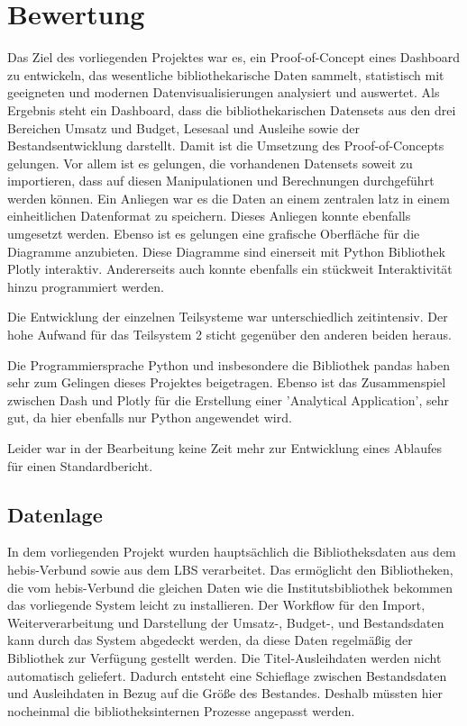 \section{Bewertung}
Das Ziel des vorliegenden Projektes war es, ein Proof-of-Concept eines Dashboard zu entwickeln, 
das wesentliche bibliothekarische Daten sammelt, statistisch mit geeigneten und modernen Datenvisualisierungen analysiert und
auswertet. Als Ergebnis steht ein Dashboard, dass die bibliothekarischen Datensets aus den drei Bereichen Umsatz und Budget,
Lesesaal und Ausleihe sowie der Bestandsentwicklung darstellt. Damit ist die Umsetzung des Proof-of-Concepts gelungen.
Vor allem ist es gelungen, die vorhandenen Datensets soweit zu importieren, dass auf diesen Manipulationen und Berechnungen
durchgeführt werden können. Ein Anliegen war es die Daten an einem zentralen latz in einem einheitlichen Datenformat zu speichern. Dieses
Anliegen konnte ebenfalls umgesetzt werden. Ebenso ist es gelungen eine grafische Oberfläche für die Diagramme anzubieten. 
Diese Diagramme sind einerseit mit Python Bibliothek Plotly interaktiv. Andererseits auch konnte ebenfalls ein stückweit Interaktivität hinzu programmiert werden.

Die Entwicklung der einzelnen Teilsysteme war unterschiedlich zeitintensiv. Der hohe Aufwand für das Teilsystem 2 sticht gegenüber
den anderen beiden heraus. 

Die Programmiersprache Python und insbesondere die Bibliothek pandas haben sehr zum Gelingen dieses Projektes beigetragen.
Ebenso ist das Zusammenspiel zwischen Dash und Plotly für die Erstellung einer 'Analytical Application', sehr gut, da hier
ebenfalls nur Python angewendet wird.

Leider war in der Bearbeitung keine Zeit mehr zur Entwicklung eines Ablaufes für einen Standardbericht.



\subsection{Datenlage}
In dem vorliegenden Projekt wurden hauptsächlich die Bibliotheksdaten aus dem hebis-Verbund sowie aus dem LBS verarbeitet.
Das ermöglicht den Bibliotheken, die vom hebis-Verbund die gleichen Daten wie die Institutsbibliothek bekommen
das vorliegende System leicht zu installieren.
Der Workflow für den Import, Weiterverarbeitung und Darstellung der Umsatz-, Budget-, und Bestandsdaten kann durch das System
abgedeckt werden, da diese Daten regelmäßig der Bibliothek zur Verfügung gestellt werden. Die Titel-Ausleihdaten werden nicht automatisch
geliefert. Dadurch entsteht eine Schieflage zwischen Bestandsdaten und Ausleihdaten in Bezug auf die Größe des Bestandes.
Deshalb müssten hier nocheinmal die bibliotheksinternen Prozesse angepasst werden.


